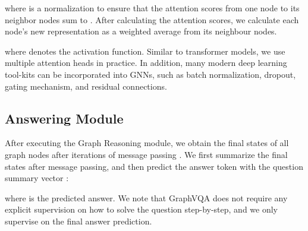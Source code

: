 \documentclass[11pt]{article}
\begin{document}
where  is a normalization to ensure that the attention scores from one node to its neighbor nodes sum to . 
After calculating the attention scores, we calculate each node's new representation as a weighted average from its neighbour nodes. 

where  denotes the activation function. 
Similar to transformer models, we use multiple attention heads in practice. 
In addition, many modern deep learning tool-kits can be incorporated into GNNs, such as batch normalization, dropout, gating mechanism, and residual connections. 







\subsection{Answering Module}
After executing the Graph Reasoning module, we obtain the final states of all graph nodes after  iterations of message passing . 
We first summarize the final states after message passing, and then predict the answer token with the question summary vector : 

where  is the predicted answer. 
We note that GraphVQA does not require any explicit supervision on how to solve the question step-by-step, and we only supervise on the final answer prediction. 
 
\end{document}
